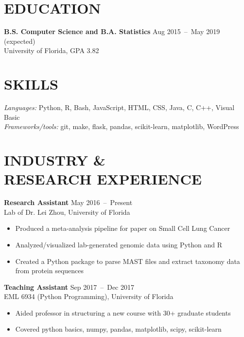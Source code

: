 \documentclass[line,resmargin]{res}
\begin{document}
\address{}
\address{}

\begin{resume}

\section{EDUCATION}
    \textbf{B.S. Computer Science and B.A. Statistics} \hfill Aug 2015~--~May 2019 (expected) \\
    University of Florida, GPA 3.82


\section{SKILLS}
    {\sl Languages:} Python, R, Bash, JavaScript, HTML, CSS, Java, C, C++, Visual Basic \\
    {\sl Frameworks/tools:} git, make, flask, pandas, scikit-learn, matplotlib, WordPress

\section{INDUSTRY \& \\ RESEARCH EXPERIENCE}
    \textbf{Research Assistant}    \hfill May 2016~--~Present \\
    Lab of Dr. Lei Zhou, University of Florida
    \begin{itemize}  \itemsep -2pt %
        \item Produced a meta-analysis pipeline for paper on Small Cell Lung Cancer
        \item Analyzed/visualized lab-generated genomic data using Python and R
        \item Created a Python package to parse MAST files and extract taxonomy data from protein sequences
    \end{itemize}

    \textbf{Teaching Assistant}    \hfill Sep 2017~--~Dec 2017 \\
    EML 6934 (Python Programming), University of Florida
    \begin{itemize}  \itemsep -2pt %
        \item Aided professor in structuring a new course with 30+ graduate students
        \item Covered python basics, numpy, pandas, matplotlib, scipy, scikit-learn
    \end{itemize}


\end{resume}
\end{document}
